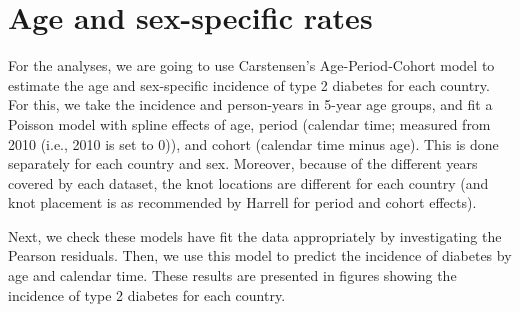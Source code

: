 \documentclass[11pt]{article}
\begin{document}
\section{Age and sex-specific rates}
\label{asrsec}

For the analyses, we are going to use Carstensen's Age-Period-Cohort model \cite{CarstensenSTATMED2007}
to estimate the age and sex-specific incidence of type 2 diabetes for each country. For this, 
we take the incidence and person-years in 5-year age groups, and fit a Poisson model with spline effects
of age, period (calendar time; measured from 2010 (i.e., 2010 is set to 0)), and cohort (calendar time minus age). 
This is done separately for each country and sex. Moreover, because of the different years covered by each dataset,
the knot locations are different for each country (and knot placement is as recommended by Harrell \cite{Harrell2001Springer} 
for period and cohort effects).

Next, we check these models have fit the data appropriately by investigating the Pearson residuals. 
Then, we use this model to predict the incidence of diabetes by age and calendar time. 
These results are presented in figures showing the 
incidence of type 2 diabetes for each country.
\end{document}
